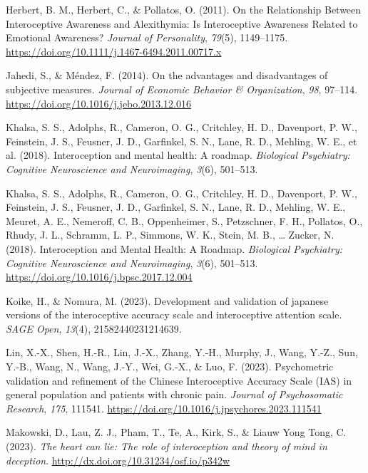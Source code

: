 \documentclass[
  man,
  floatsintext,
  longtable,
  nolmodern,
  notxfonts,
  notimes,
  colorlinks=true,linkcolor=blue,citecolor=blue,urlcolor=blue]{apa7}
\newlength{\cslhangindent}
\newenvironment{CSLReferences}[2] %
 {\begin{list}{}{%
  \setlength{\itemindent}{0pt}
  \setlength{\leftmargin}{0pt}
  \setlength{\parsep}{0pt}
  \ifodd #1
   \setlength{\leftmargin}{\cslhangindent}
   \setlength{\itemindent}{-1\cslhangindent}
  \fi
  \setlength{\itemsep}{#2\baselineskip}}}
 {\end{list}}
\begin{document}
\begin{CSLReferences}{1}{0}
Herbert, B. M., Herbert, C., \& Pollatos, O. (2011). On the Relationship
Between Interoceptive Awareness and Alexithymia: Is Interoceptive
Awareness Related to Emotional Awareness? \emph{Journal of Personality},
\emph{79}(5), 1149--1175.
\url{https://doi.org/10.1111/j.1467-6494.2011.00717.x}

Jahedi, S., \& Méndez, F. (2014). On the advantages and disadvantages of
subjective measures. \emph{Journal of Economic Behavior \&
Organization}, \emph{98}, 97--114.
\url{https://doi.org/10.1016/j.jebo.2013.12.016}

Khalsa, S. S., Adolphs, R., Cameron, O. G., Critchley, H. D., Davenport,
P. W., Feinstein, J. S., Feusner, J. D., Garfinkel, S. N., Lane, R. D.,
Mehling, W. E., et al. (2018). Interoception and mental health: A
roadmap. \emph{Biological Psychiatry: Cognitive Neuroscience and
Neuroimaging}, \emph{3}(6), 501--513.

Khalsa, S. S., Adolphs, R., Cameron, O. G., Critchley, H. D., Davenport,
P. W., Feinstein, J. S., Feusner, J. D., Garfinkel, S. N., Lane, R. D.,
Mehling, W. E., Meuret, A. E., Nemeroff, C. B., Oppenheimer, S.,
Petzschner, F. H., Pollatos, O., Rhudy, J. L., Schramm, L. P., Simmons,
W. K., Stein, M. B., \ldots{} Zucker, N. (2018). Interoception and
Mental Health: A Roadmap. \emph{Biological Psychiatry: Cognitive
Neuroscience and Neuroimaging}, \emph{3}(6), 501--513.
\url{https://doi.org/10.1016/j.bpsc.2017.12.004}

Koike, H., \& Nomura, M. (2023). Development and validation of japanese
versions of the interoceptive accuracy scale and interoceptive attention
scale. \emph{SAGE Open}, \emph{13}(4), 21582440231214639.

Lin, X.-X., Shen, H.-R., Lin, J.-X., Zhang, Y.-H., Murphy, J., Wang,
Y.-Z., Sun, Y.-B., Wang, N., Wang, J.-Y., Wei, G.-X., \& Luo, F. (2023).
Psychometric validation and refinement of the Chinese Interoceptive
Accuracy Scale (IAS) in general population and patients with chronic
pain. \emph{Journal of Psychosomatic Research}, \emph{175}, 111541.
\url{https://doi.org/10.1016/j.jpsychores.2023.111541}

Makowski, D., Lau, Z. J., Pham, T., Te, A., Kirk, S., \& Liauw Yong
Tong, C. (2023). \emph{The heart can lie: The role of interoception and
theory of mind in deception}.
\url{http://dx.doi.org/10.31234/osf.io/p342w}


\end{CSLReferences}
\end{document}
